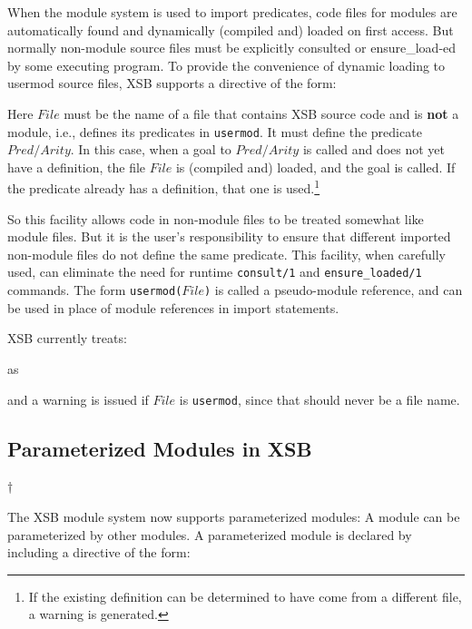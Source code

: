 When the module system is used to import predicates, code files for
modules are automatically found and dynamically (compiled and) loaded
on first access.  But normally non-module source files must be
explicitly consulted or ensure\_load-ed by some executing program.  To
provide the convenience of dynamic loading to usermod source files,
XSB supports a directive of the form:


\noindent Here $File$ must be the name of a file that contains XSB
source code and is {\bf not} a module, i.e., defines its predicates in
{\tt usermod}.  It must define the predicate $Pred/Arity$.  In this
case, when a goal to $Pred/Arity$ is called and does not yet have a
definition, the file $File$ is (compiled and) loaded, and the goal is
called.  If the predicate already has a definition, that one is
used.\footnote{If the existing definition can be determined to have
  come from a different file, a warning is generated.}

So this facility allows code in non-module files to be treated
somewhat like module files.  But it is the user's responsibility to
ensure that different imported non-module files do not define the same
predicate.  This facility, when carefully used, can eliminate the need
for runtime {\tt consult/1} and {\tt ensure\_loaded/1} commands.  The
form {\tt usermod($File$)} is called a pseudo-module reference, and
can be used in place of module references in import statements.

XSB currently treats:


\noindent as

  
\noindent and a warning is issued if $File$ is {\tt usermod}, since
that should never be a file name.

\subsection{Parameterized Modules in XSB}†

The XSB module system now supports parameterized modules: A module can
be parameterized by other modules.  A parameterized module is declared
by including a directive of the form:


